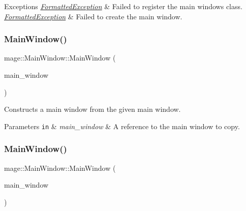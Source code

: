 \begin{DoxyExceptions}{Exceptions}
{\em \hyperlink{structmage_1_1_formatted_exception}{Formatted\+Exception}} & Failed to register the main window\textquotesingle{}s class. \\
\hline
{\em \hyperlink{structmage_1_1_formatted_exception}{Formatted\+Exception}} & Failed to create the main window. \\
\hline
\end{DoxyExceptions}
\hypertarget{classmage_1_1_main_window_a8dc3c590bb168f8178a7db72ff60fd0c}{}\label{classmage_1_1_main_window_a8dc3c590bb168f8178a7db72ff60fd0c} 
\subsubsection{\texorpdfstring{Main\+Window()}{MainWindow()}\hspace{0.1cm}{\footnotesize\ttfamily [2/3]}}
{\footnotesize\ttfamily mage\+::\+Main\+Window\+::\+Main\+Window (\begin{DoxyParamCaption}\item[{const \hyperlink{classmage_1_1_main_window}{Main\+Window} \&}]{main\+\_\+window }\end{DoxyParamCaption})\hspace{0.3cm}{\ttfamily [delete]}}

Constructs a main window from the given main window.


\begin{DoxyParams}[1]{Parameters}
\mbox{\tt in}  & {\em main\+\_\+window} & A reference to the main window to copy. \\
\hline
\end{DoxyParams}
\hypertarget{classmage_1_1_main_window_ab5c9cc962420580c62dd2b44c142cf4b}{}\label{classmage_1_1_main_window_ab5c9cc962420580c62dd2b44c142cf4b} 
\subsubsection{\texorpdfstring{Main\+Window()}{MainWindow()}\hspace{0.1cm}{\footnotesize\ttfamily [3/3]}}
{\footnotesize\ttfamily mage\+::\+Main\+Window\+::\+Main\+Window (\begin{DoxyParamCaption}\item[{\hyperlink{classmage_1_1_main_window}{Main\+Window} \&\&}]{main\+\_\+window }\end{DoxyParamCaption})\hspace{0.3cm}{\ttfamily [default]}}

